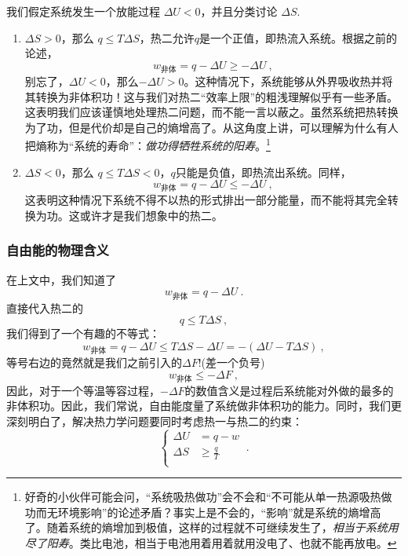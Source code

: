 我们假定系统发生一个放能过程 $\Delta U < 0$，并且分类讨论 $\Delta S$.
\begin{enumerate}
\item $\Delta S > 0$，那么 $q \le T\Delta S$，热二允许$q$是一个正值，即热流入系统。根据之前的论述，
$$
w_\text{非体} = q - \Delta U \ge - \Delta U 
~,
$$
别忘了，$\Delta U<0$，那么$-\Delta U>0$。这种情况下，系统能够从外界吸收热并将其转换为非体积功！这与我们对热二“效率上限”的粗浅理解似乎有一些矛盾。这表明我们应该谨慎地处理热二问题，而不能一言以蔽之。虽然系统把热转换为了功，但是代价却是自己的熵增高了。从这角度上讲，可以理解为什么有人把熵称为“系统的寿命”：\textsl{做功得牺牲系统的阳寿}。\footnote{好奇的小伙伴可能会问，“系统吸热做功”会不会和“不可能从单一热源吸热做功而无环境影响”的论述矛盾？事实上是不会的，“影响”就是系统的熵增高了。随着系统的熵增加到极值，这样的过程就不可继续发生了，\textsl{相当于系统用尽了阳寿}。类比电池，相当于电池用着用着就用没电了、也就不能再放电。}
\item $\Delta S < 0$，那么 $q \le T\Delta S < 0$，$q$只能是负值，即热流出系统。同样，
$$
w_\text{非体} = q - \Delta U \le - \Delta U 
~,
$$
这表明这种情况下系统不得不以热的形式排出一部分能量，而不能将其完全转换为功。这或许才是我们想象中的热二。
\end{enumerate}

\subsubsection{自由能的物理含义}
在上文中，我们知道了
$$ w_{\text{非体}} = q - \Delta U~.$$
直接代入热二的
$$
q \le T\Delta S
~,
$$
我们得到了一个有趣的不等式：
$$
w_{\text{非体}} = q - \Delta U \le T \Delta S - \Delta U = - (\Delta U-T \Delta S ) ~,
$$
等号右边的竟然就是我们之前引入的$\Delta F$!(差一个负号) 
\begin{equation}
w_\text{非体} \le - \Delta F~,
\end{equation}
因此，对于一个等温等容过程，$-\Delta F$的数值含义是过程后系统能对外做的最多的非体积功。因此，我们常说，自由能度量了系统做非体积功的能力。同时，我们更深刻明白了，解决热力学问题要同时考虑热一与热二的约束：
\begin{equation}
\left \{
    \begin{aligned}
    \Delta U &= q-w\\
    \Delta S &\ge \frac{q}{T}\\
    \end{aligned}
\right.~.
\end{equation}


